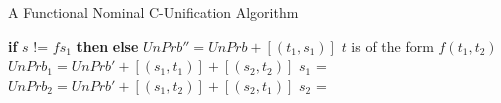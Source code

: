 \begin{frame}[allowframebreaks]{A Functional Nominal C-Unification Algorithm}
\begin{algorithmic}[1]
                \State \textbf{if} $s$ != $f s_1$ \textbf{then} 
                \State \textbf{else} 
                    \State \hspace{8 \algorithmicxindent}
                    $UnPrb'' = UnPrb + [(t_1, s_1)]$ 
                    \State \hspace{8 \algorithmicxindent}
            \Statex\Statex\Statex\Statex
            \Statex\Statex\Statex\Statex
            \Else \Comment $t$ is of the form $f(t_1, t_2)$
                 
                \Else
                    \State $UnPrb_1 = UnPrb' + [(s_1, t_1)] + [(s_2, t_2)]$
                    \State $s_1$ = 
                    \State $UnPrb_2 = UnPrb' + [(s_1, t_2)] + [(s_2, t_1)]$
                    \State $s_2$ = 
                    \State {}
                \Endif
            \Endif
        \Endif
    \Endif
\EndProcedure
\end{algorithmic}
\end{frame}

%

